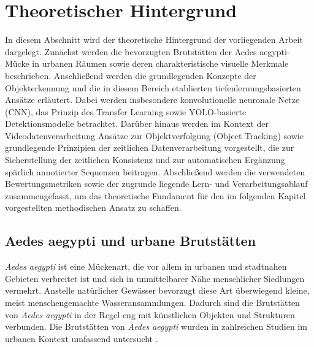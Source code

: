 \newpage
\section{Theoretischer Hintergrund}
In diesem Abschnitt wird der theoretische Hintergrund der vorliegenden Arbeit dargelegt.
Zunächst werden die bevorzugten Brutstätten der Aedes aegypti-Mücke in urbanen Räumen 
sowie deren charakteristische visuelle Merkmale beschrieben. Anschließend werden die 
grundlegenden Konzepte der Objekterkennung und die in diesem Bereich etablierten 
tiefenlernungsbasierten Ansätze erläutert. Dabei werden insbesondere konvolutionelle 
neuronale Netze (CNN), das Prinzip des Transfer Learning sowie YOLO-basierte 
Detektionsmodelle betrachtet. Darüber hinaus werden im Kontext der 
Videodatenverarbeitung Ansätze zur Objektverfolgung (Object Tracking) sowie grundlegende
Prinzipien der zeitlichen Datenverarbeitung vorgestellt, die zur Sicherstellung der 
zeitlichen Konsistenz und zur automatischen Ergänzung spärlich annotierter Sequenzen 
beitragen. Abschließend werden die verwendeten Bewertungsmetriken sowie der zugrunde 
liegende Lern- und Verarbeitungsablauf zusammengefasst, um das theoretische Fundament 
für den im folgenden Kapitel vorgestellten methodischen Ansatz zu schaffen.

\subsection{Aedes aegypti und urbane Brutstätten}

\textit{Aedes aegypti} ist eine Mückenart, die vor allem in urbanen und stadtnahen Gebieten verbreitet ist und sich in unmittelbarer Nähe menschlicher Siedlungen vermehrt. Anstelle natürlicher Gewässer bevorzugt diese Art überwiegend kleine, meist menschengemachte Wasseransammlungen. Dadurch sind die Brutstätten von \textit{Aedes aegypti} in der Regel eng mit künstlichen Objekten und Strukturen verbunden. Die Brutstätten von \textit{Aedes aegypti} wurden in zahlreichen Studien im urbanen Kontext umfassend untersucht \cite{Vezzani2002,Paploski2016,Cavalcanti2016,Valenca2013}.

